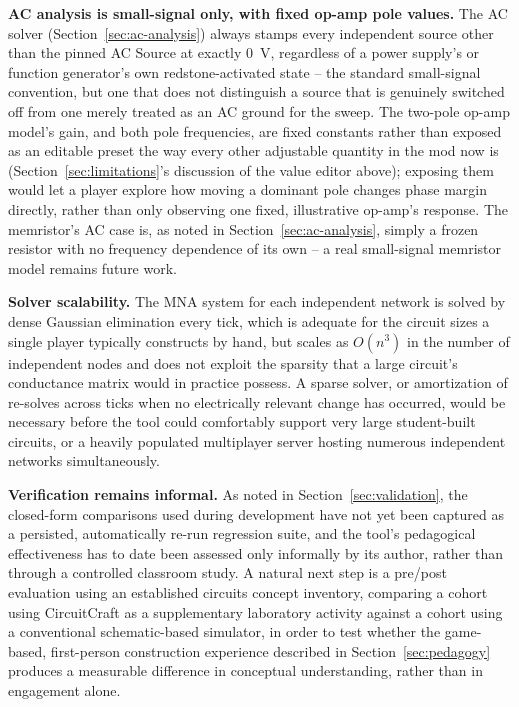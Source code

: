 \textbf{AC analysis is small-signal only, with fixed op-amp pole values.} The AC solver
(Section~\ref{sec:ac-analysis}) always stamps every independent source other than the pinned
AC Source at exactly 0~V, regardless of a power supply's or function generator's own
redstone-activated state -- the standard small-signal convention, but one that does not
distinguish a source that is genuinely switched off from one merely treated as an AC ground
for the sweep. The two-pole op-amp model's gain, and both pole frequencies, are fixed
constants rather than exposed as an editable preset the way every other adjustable quantity
in the mod now is (Section~\ref{sec:limitations}'s discussion of the value editor above);
exposing them would let a player explore how moving a dominant pole changes phase margin
directly, rather than only observing one fixed, illustrative op-amp's response. The
memristor's AC case is, as noted in Section~\ref{sec:ac-analysis}, simply a frozen resistor
with no frequency dependence of its own -- a real small-signal memristor model remains
future work.

\textbf{Solver scalability.} The MNA system for each independent network is solved by dense
Gaussian elimination every tick, which is adequate for the circuit sizes a single player
typically constructs by hand, but scales as $O(n^3)$ in the number of independent nodes and
does not exploit the sparsity that a large circuit's conductance matrix would in practice
possess. A sparse solver, or amortization of re-solves across ticks when no electrically
relevant change has occurred, would be necessary before the tool could comfortably support
very large student-built circuits, or a heavily populated multiplayer server hosting
numerous independent networks simultaneously.

\textbf{Verification remains informal.} As noted in Section~\ref{sec:validation}, the
closed-form comparisons used during development have not yet been captured as a persisted,
automatically re-run regression suite, and the tool's pedagogical effectiveness has to date
been assessed only informally by its author, rather than through a controlled classroom
study. A natural next step is a pre/post evaluation using an established circuits concept
inventory, comparing a cohort using CircuitCraft as a supplementary laboratory activity
against a cohort using a conventional schematic-based simulator, in order to test whether
the game-based, first-person construction experience described in Section~\ref{sec:pedagogy}
produces a measurable difference in conceptual understanding, rather than in engagement
alone.

